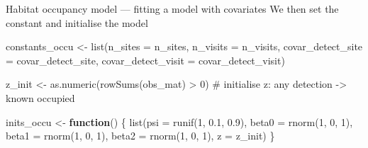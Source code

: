 \documentclass[
  10pt,
  ignorenonframetext,
  aspectratio=169,
  t]{beamer}
\newenvironment{Shaded}{\begin{snugshade}}{\end{snugshade}}
\newcommand{\AttributeTok}[1]{\textcolor[rgb]{0.40,0.45,0.13}{#1}}
\newcommand{\CommentTok}[1]{\textcolor[rgb]{0.37,0.37,0.37}{#1}}
\newcommand{\ControlFlowTok}[1]{\textcolor[rgb]{0.00,0.23,0.31}{\textbf{#1}}}
\newcommand{\DecValTok}[1]{\textcolor[rgb]{0.68,0.00,0.00}{#1}}
\newcommand{\FloatTok}[1]{\textcolor[rgb]{0.68,0.00,0.00}{#1}}
\newcommand{\FunctionTok}[1]{\textcolor[rgb]{0.28,0.35,0.67}{#1}}
\newcommand{\NormalTok}[1]{\textcolor[rgb]{0.00,0.23,0.31}{#1}}
\newcommand{\OtherTok}[1]{\textcolor[rgb]{0.00,0.23,0.31}{#1}}
\newcommand{\SpecialCharTok}[1]{\textcolor[rgb]{0.37,0.37,0.37}{#1}}
\begin{document}
\begin{frame}[fragile]{Habitat occupancy model --- fitting a model with
covariates}
\protect{}\label{habitat-occupancy-model-fitting-a-model-with-covariates-2}
We then set the constant and initialise the model

\footnotesize

\begin{Shaded}
\begin{Highlighting}[]
\NormalTok{constants\_occu }\OtherTok{\textless{}{-}} \FunctionTok{list}\NormalTok{(}\AttributeTok{n\_sites =}\NormalTok{ n\_sites,}
                       \AttributeTok{n\_visits =}\NormalTok{ n\_visits,}
                       \AttributeTok{covar\_detect\_site =}\NormalTok{ covar\_detect\_site,}
                       \AttributeTok{covar\_detect\_visit =}\NormalTok{ covar\_detect\_visit)}

\NormalTok{z\_init }\OtherTok{\textless{}{-}} \FunctionTok{as.numeric}\NormalTok{(}\FunctionTok{rowSums}\NormalTok{(obs\_mat) }\SpecialCharTok{\textgreater{}} \DecValTok{0}\NormalTok{) }\CommentTok{\# initialise z: any detection {-}\textgreater{} known occupied}

\NormalTok{inits\_occu }\OtherTok{\textless{}{-}} \ControlFlowTok{function}\NormalTok{() \{}
  \FunctionTok{list}\NormalTok{(}\AttributeTok{psi =} \FunctionTok{runif}\NormalTok{(}\DecValTok{1}\NormalTok{, }\FloatTok{0.1}\NormalTok{, }\FloatTok{0.9}\NormalTok{),}
       \AttributeTok{beta0 =} \FunctionTok{rnorm}\NormalTok{(}\DecValTok{1}\NormalTok{, }\DecValTok{0}\NormalTok{, }\DecValTok{1}\NormalTok{),}
       \AttributeTok{beta1 =} \FunctionTok{rnorm}\NormalTok{(}\DecValTok{1}\NormalTok{, }\DecValTok{0}\NormalTok{, }\DecValTok{1}\NormalTok{),}
       \AttributeTok{beta2 =} \FunctionTok{rnorm}\NormalTok{(}\DecValTok{1}\NormalTok{, }\DecValTok{0}\NormalTok{, }\DecValTok{1}\NormalTok{),}
       \AttributeTok{z =}\NormalTok{ z\_init)}
\NormalTok{\}}
\end{Highlighting}
\end{Shaded}

\normalsize
\end{frame}
\end{document}
